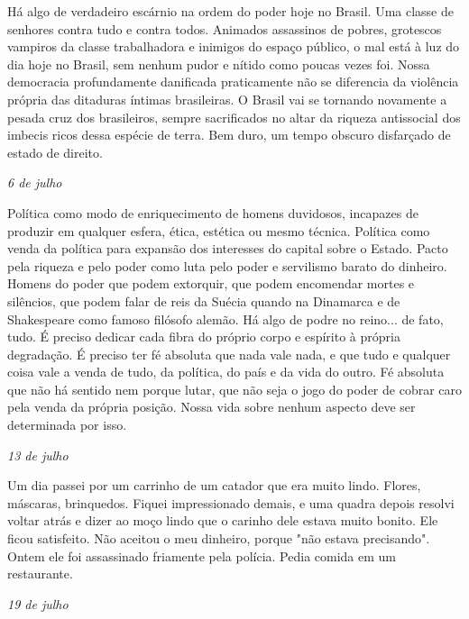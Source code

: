 Há algo de verdadeiro escárnio na ordem do poder hoje no Brasil. Uma
classe de senhores contra tudo e contra todos. Animados assassinos de
pobres, grotescos vampiros da classe trabalhadora e inimigos do espaço
público, o mal está à luz do dia hoje no Brasil, sem nenhum pudor e
nítido como poucas vezes foi. Nossa democracia profundamente danificada
praticamente não se diferencia da violência própria das ditaduras
íntimas brasileiras. O Brasil vai se tornando novamente a pesada cruz
dos brasileiros, sempre sacrificados no altar da riqueza antissocial dos
imbecis ricos dessa espécie de terra. Bem duro, um tempo obscuro
disfarçado de estado de direito.

\begin{flushright}
\emph{6 de julho}
\end{flushright}

Política como modo de enriquecimento de homens duvidosos, incapazes de
produzir em qualquer esfera, ética, estética ou mesmo técnica. Política
como venda da política para expansão dos interesses do capital sobre o
Estado. Pacto pela riqueza e pelo poder como luta pelo poder e
servilismo barato do dinheiro. Homens do poder que podem extorquir, que
podem encomendar mortes e silêncios, que podem falar de reis da Suécia
quando na Dinamarca e de Shakespeare como famoso filósofo alemão. Há
algo de podre no reino... de fato, tudo. É preciso dedicar cada fibra do
próprio corpo e espírito à própria degradação. É preciso ter fé absoluta
que nada vale nada, e que tudo e qualquer coisa vale a venda de tudo, da
política, do país e da vida do outro. Fé absoluta que não há sentido nem
porque lutar, que não seja o jogo do poder de cobrar caro pela venda da
própria posição. Nossa vida sobre nenhum aspecto deve ser determinada
por isso.

\begin{flushright}
\emph{13 de julho}
\end{flushright}

Um dia passei por um carrinho de um catador que era muito lindo. Flores,
máscaras, brinquedos. Fiquei impressionado demais, e uma quadra depois
resolvi voltar atrás e dizer ao moço lindo que o carinho dele estava
muito bonito. Ele ficou satisfeito. Não aceitou o meu dinheiro, porque
"não estava precisando". Ontem ele foi assassinado friamente pela
polícia. Pedia comida em um restaurante.

\begin{flushright}
\emph{19 de julho}
\end{flushright}

